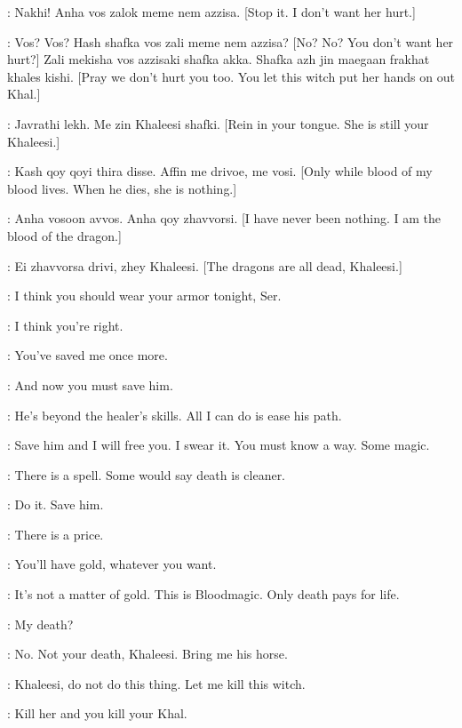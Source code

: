 \DAENERYS: Nakhi! Anha vos zalok meme nem azzisa. [Stop it. I don't want her hurt.] 

\QOTHO: Vos? Vos? Hash shafka vos zali meme nem azzisa? [No? No? You don't want her hurt?] Zali mekisha vos azzisaki shafka akka. Shafka azh jin maegaan frakhat khales kishi. [Pray we don't hurt you too. You let this witch put her hands on out Khal.] 

\JORAH: Javrathi lekh. Me zin Khaleesi shafki. [Rein in your tongue. She is still your Khaleesi.] 

\QOTHO: Kash qoy qoyi thira disse. Affin me drivoe, me vosi. [Only while blood of my blood lives. When he dies, she is nothing.] 

\DAENERYS: Anha vosoon avvos. Anha qoy zhavvorsi. [I have never been nothing. I am the blood of the dragon.] 

\QOTHO: Ei zhavvorsa drivi, zhey Khaleesi. [The dragons are all dead, Khaleesi.] 


\DAENERYS: I think you should wear your armor tonight, Ser. 

\JORAH: I think you're right. 


\MIRRI: You've saved me once more. 

\DAENERYS: And now you must save him. 

\MIRRI: He's beyond the healer's skills. All I can do is ease his path. 

\DAENERYS: Save him and I will free you. I swear it. You must know a way. Some magic. 

\MIRRI: There is a spell. Some would say death is cleaner. 

\DAENERYS: Do it. Save him. 

\MIRRI: There is a price. 

\DAENERYS: You'll have gold, whatever you want. 

\MIRRI: It's not a matter of gold. This is Bloodmagic. Only death pays for life. 

\DAENERYS: My death? 

\MIRRI: No. Not your death, Khaleesi. Bring me his horse. 


\RAKHARO: Khaleesi, do not do this thing. Let me kill this witch. 

\DAENERYS: Kill her and you kill your Khal. 


